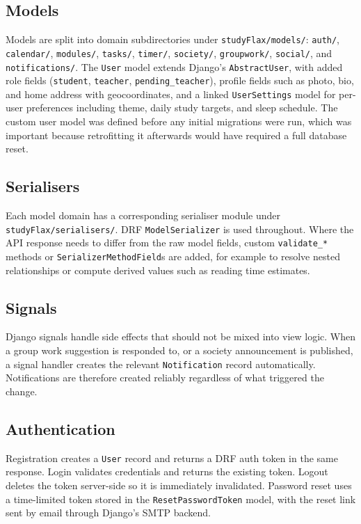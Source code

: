 \subsection{Models}

Models are split into domain subdirectories under \texttt{studyFlax/models/}: \texttt{auth/}, \texttt{calendar/}, \texttt{modules/}, \texttt{tasks/}, \texttt{timer/}, \texttt{society/}, \texttt{groupwork/}, \texttt{social/}, and \texttt{notifications/}. The \texttt{User} model extends Django's \texttt{AbstractUser}, with added role fields (\texttt{student}, \texttt{teacher}, \texttt{pending\_teacher}), profile fields such as photo, bio, and home address with geocoordinates, and a linked \texttt{UserSettings} model for per-user preferences including theme, daily study targets, and sleep schedule. The custom user model was defined before any initial migrations were run, which was important because retrofitting it afterwards would have required a full database reset.

\subsection{Serialisers}

Each model domain has a corresponding serialiser module under \texttt{studyFlax/serialisers/}. DRF \texttt{ModelSerializer} is used throughout. Where the API response needs to differ from the raw model fields, custom \texttt{validate\_*} methods or \texttt{Serializer\allowbreak{}MethodField}s are added, for example to resolve nested relationships or compute derived values such as reading time estimates.

\subsection{Signals}

Django signals handle side effects that should not be mixed into view logic. When a group work suggestion is responded to, or a society announcement is published, a signal handler creates the relevant \texttt{Notification} record automatically. Notifications are therefore created reliably regardless of what triggered the change.

\subsection{Authentication}

Registration creates a \texttt{User} record and returns a DRF auth token in the same response. Login validates credentials and returns the existing token. Logout deletes the token server-side so it is immediately invalidated. Password reset uses a time-limited token stored in the \texttt{ResetPasswordToken} model, with the reset link sent by email through Django's SMTP backend.

